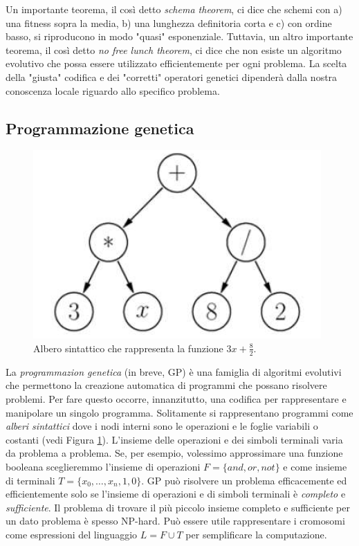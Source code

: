 \documentclass[10pt,a4paper]{article}
\begin{document}
Un importante teorema, il così detto \emph{schema theorem}, ci dice che schemi con a) una fitness sopra la media, b) una lunghezza definitoria corta e c) con ordine basso, si riproducono in modo "quasi" esponenziale. Tuttavia, un altro importante teorema, il così detto \emph{no free lunch theorem}, ci dice che non esiste un algoritmo evolutivo che possa essere utilizzato efficientemente per ogni problema. La scelta della "giusta" codifica e dei "corretti" operatori genetici dipenderà dalla nostra conoscenza locale riguardo allo specifico problema.

\subsection{Programmazione genetica}


\begin{figure}
\centering
\includegraphics[scale=0.3]{img/parsetree.png}
\caption{Albero sintattico che rappresenta la funzione $3x + \frac{8}{2}$.}
\label{fig:37}
\end{figure}

La \emph{programmazion genetica} (in breve, GP) è una famiglia di algoritmi evolutivi che permettono la creazione automatica di programmi che possano risolvere problemi. Per fare questo occorre, innanzitutto, una codifica per rappresentare e manipolare un singolo programma. Solitamente si rappresentano programmi come \emph{alberi sintattici} dove i nodi interni sono le operazioni e le foglie variabili o costanti (vedi Figura \ref{fig:37}). L'insieme delle operazioni e dei simboli terminali varia da problema a problema. Se, per esempio, volessimo approssimare una funzione booleana sceglieremmo l'insieme di operazioni $F = \{and, or, not\}$ e come insieme di terminali $T = \{ x_0, \dots, x_n, 1, 0 \}$. GP può risolvere un problema efficacemente ed efficientemente solo se l'insieme di operazioni e di simboli terminali è \emph{completo} e \emph{sufficiente}. Il problema di trovare il più piccolo insieme completo e sufficiente per un dato problema è spesso NP-hard. Può essere utile rappresentare i cromosomi come espressioni del linguaggio $L = F \cup T$ per semplificare la computazione. 
\end{document}
